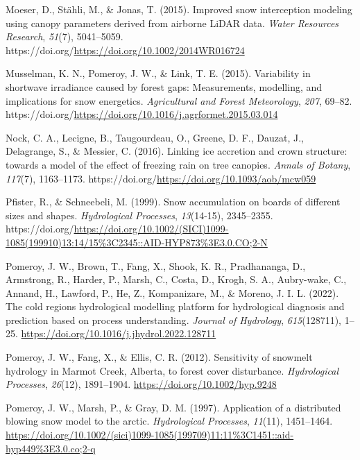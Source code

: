 \documentclass[
  letterpaper,
  DIV=11,
  numbers=noendperiod]{scrartcl}
\newlength{\cslhangindent}
\newenvironment{CSLReferences}[2] %
 {\begin{list}{}{%
  \setlength{\itemindent}{0pt}
  \setlength{\leftmargin}{0pt}
  \setlength{\parsep}{0pt}
  \ifodd #1
   \setlength{\leftmargin}{\cslhangindent}
   \setlength{\itemindent}{-1\cslhangindent}
  \fi
  \setlength{\itemsep}{#2\baselineskip}}}
 {\end{list}}
\begin{document}
\begin{CSLReferences}{1}{0}
Moeser, D., Stähli, M., \& Jonas, T. (2015). {Improved snow interception
modeling using canopy parameters derived from airborne LiDAR data}.
\emph{Water Resources Research}, \emph{51}(7), 5041--5059.
https://doi.org/\url{https://doi.org/10.1002/2014WR016724}

Musselman, K. N., Pomeroy, J. W., \& Link, T. E. (2015). {Variability in
shortwave irradiance caused by forest gaps: Measurements, modelling, and
implications for snow energetics}. \emph{Agricultural and Forest
Meteorology}, \emph{207}, 69--82.
https://doi.org/\url{https://doi.org/10.1016/j.agrformet.2015.03.014}

Nock, C. A., Lecigne, B., Taugourdeau, O., Greene, D. F., Dauzat, J.,
Delagrange, S., \& Messier, C. (2016). {Linking ice accretion and crown
structure: towards a model of the effect of freezing rain on tree
canopies}. \emph{Annals of Botany}, \emph{117}(7), 1163--1173.
https://doi.org/\url{https://doi.org/10.1093/aob/mcw059}

Pfister, R., \& Schneebeli, M. (1999). {Snow accumulation on boards of
different sizes and shapes}. \emph{Hydrological Processes},
\emph{13}(14-15), 2345--2355.
https://doi.org/\url{https://doi.org/10.1002/(SICI)1099-1085(199910)13:14/15\%3C2345::AID-HYP873\%3E3.0.CO;2-N}

Pomeroy, J. W., Brown, T., Fang, X., Shook, K. R., Pradhananga, D.,
Armstrong, R., Harder, P., Marsh, C., Costa, D., Krogh, S. A.,
Aubry-wake, C., Annand, H., Lawford, P., He, Z., Kompanizare, M., \&
Moreno, J. I. L. (2022). {The cold regions hydrological modelling
platform for hydrological diagnosis and prediction based on process
understanding}. \emph{Journal of Hydrology}, \emph{615}(128711), 1--25.
\url{https://doi.org/10.1016/j.jhydrol.2022.128711}

Pomeroy, J. W., Fang, X., \& Ellis, C. R. (2012). {Sensitivity of
snowmelt hydrology in Marmot Creek, Alberta, to forest cover
disturbance}. \emph{Hydrological Processes}, \emph{26}(12), 1891--1904.
\url{https://doi.org/10.1002/hyp.9248}

Pomeroy, J. W., Marsh, P., \& Gray, D. M. (1997). {Application of a
distributed blowing snow model to the arctic}. \emph{Hydrological
Processes}, \emph{11}(11), 1451--1464.
\url{https://doi.org/10.1002/(sici)1099-1085(199709)11:11\%3C1451::aid-hyp449\%3E3.0.co;2-q}


\end{CSLReferences}
\end{document}
